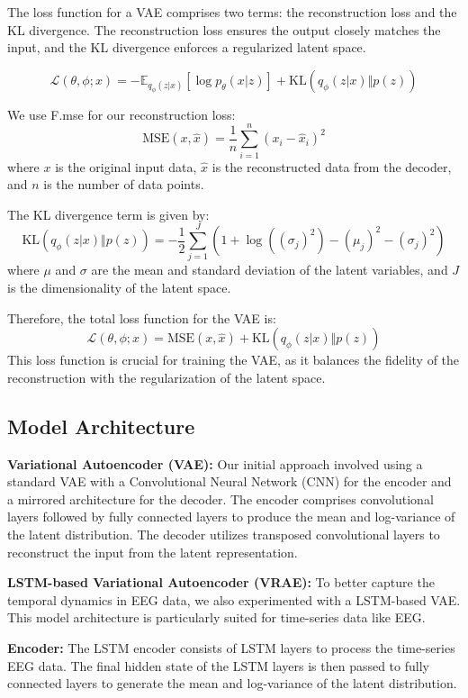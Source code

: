 \documentclass{article}
\begin{document}
The loss function for a VAE comprises two terms: the reconstruction loss and the KL divergence. The reconstruction loss ensures the output closely matches the input, and the KL divergence enforces a regularized latent space.

\[
\mathcal{L}(\theta, \phi; x) = -\mathbb{E}_{q_\phi(z|x)}[\log p_\theta(x|z)] + \text{KL}(q_\phi(z|x) \Vert p(z))
\]

We use F.mse for our reconstruction loss:
\[
\text{MSE}(x, \hat{x}) = \frac{1}{n} \sum_{i=1}^{n} (x_i - \hat{x}_i)^2
\]
where $x$ is the original input data, $\hat{x}$ is the reconstructed data from the decoder, and $n$ is the number of data points.

The KL divergence term is given by:
\[
\text{KL}(q_\phi(z|x) \Vert p(z)) = -\frac{1}{2} \sum_{j=1}^{J} (1 + \log((\sigma_j)^2) - (\mu_j)^2 - (\sigma_j)^2)
\]
where $\mu$ and $\sigma$ are the mean and standard deviation of the latent variables, and $J$ is the dimensionality of the latent space.

Therefore, the total loss function for the VAE is:
\[
\mathcal{L}(\theta, \phi; x) = \text{MSE}(x, \hat{x}) + \text{KL}(q_\phi(z|x) \Vert p(z))
\]
This loss function is crucial for training the VAE, as it balances the fidelity of the reconstruction with the regularization of the latent space.


\subsection{Model Architecture}

\textbf{Variational Autoencoder (VAE):}
Our initial approach involved using a standard VAE with a Convolutional Neural Network (CNN) for the encoder and a mirrored architecture for the decoder. The encoder comprises convolutional layers followed by fully connected layers to produce the mean and log-variance of the latent distribution. The decoder utilizes transposed convolutional layers to reconstruct the input from the latent representation.

\textbf{LSTM-based Variational Autoencoder (VRAE):}
To better capture the temporal dynamics in EEG data, we also experimented with a LSTM-based VAE. This model architecture is particularly suited for time-series data like EEG.

\textbf{Encoder:}
The LSTM encoder consists of LSTM layers to process the time-series EEG data. The final hidden state of the LSTM layers is then passed to fully connected layers to generate the mean and log-variance of the latent distribution.
\end{document}
